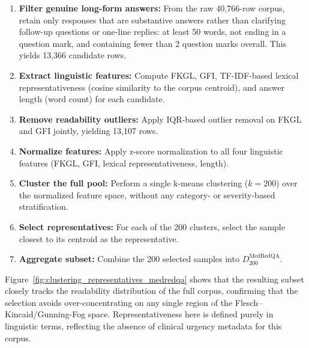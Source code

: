 \begin{enumerate}
    \item \textbf{Filter genuine long-form answers:}
    From the raw 40{,}766-row corpus, retain only responses that are substantive answers rather than clarifying follow-up questions or one-line replies: at least 50 words, not ending in a question mark, and containing fewer than 2 question marks overall. This yields 13{,}366 candidate rows.

    \item \textbf{Extract linguistic features:}
    Compute FKGL, GFI, TF-IDF-based lexical representativeness (cosine similarity to the corpus centroid), and answer length (word count) for each candidate.

    \item \textbf{Remove readability outliers:}
    Apply IQR-based outlier removal on FKGL and GFI jointly, yielding 13{,}107 rows.

    \item \textbf{Normalize features:}
    Apply z-score normalization to all four linguistic features (FKGL, GFI, lexical representativeness, length).

    \item \textbf{Cluster the full pool:}
    Perform a single k-means clustering ($k=200$) over the normalized feature space, without any category- or severity-based stratification.

    \item \textbf{Select representatives:}
    For each of the 200 clusters, select the sample closest to its centroid as the representative.

    \item \textbf{Aggregate subset:}
    Combine the 200 selected samples into $D^{\text{MedRedQA}}_{200}$.
\end{enumerate}

Figure~\ref{fig:clustering_representatives_medredqa} shows that the resulting subset closely tracks the readability distribution of the full corpus, confirming that the selection avoids over-concentrating on any single region of the Flesch--Kincaid/Gunning-Fog space. Representativeness here is defined purely in linguistic terms, reflecting the absence of clinical urgency metadata for this corpus.
